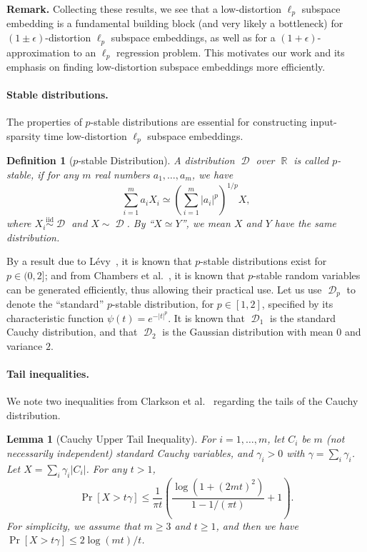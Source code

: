 \documentclass[11pt]{article}
\newtheorem{definition}{Definition}
\newtheorem{lemma}{Lemma}
\DeclareMathOperator{\R}{\mathbb{R}}
\DeclareMathOperator{\D}{\mathcal{D}}
\begin{document}
\noindent
\textbf{Remark.}
Collecting these results, we see that a low-distortion $\ell_p$ subspace
embedding is a fundamental building block (and very likely a bottleneck) for
$(1\pm\epsilon)$-distortion $\ell_p$ subspace embeddings, as well as for a
$(1+\epsilon)$-approximation to an $\ell_p$ regression problem. 
This motivates our work and its emphasis on finding low-distortion subspace 
embeddings more efficiently.

\paragraph{Stable distributions.}
\label{sec:stable-distributions}

The properties of $p$-stable distributions are essential for constructing
input-sparsity time low-distortion $\ell_p$ subspace embeddings.

\begin{definition}[$p$-stable Distribution]
  A distribution $\D$ over $\R$ is called $p$-stable, if for any $m$ real
  numbers $a_1,\ldots,a_m$, we have
  \begin{equation*}
    \sum_{i=1}^m a_i X_i \simeq \left( \sum_{i=1}^m |a_i|^p \right)^{1/p} X,
  \end{equation*}
  where $X_i \stackrel{\text{iid}}{\sim} \D$ and $X \sim \D$.
  By ``$X \simeq Y$'', we mean $X$ and $Y$ have the same distribution.
\end{definition}

\noindent
By a result due to L{\'e}vy~\cite{levy1925calcul}, it is known that $p$-stable
distributions exist for $p \in (0, 2]$; and from Chambers et
al.~\cite{chambers1976method}, it is known that $p$-stable random variables can
be generated efficiently, thus allowing their practical use.
Let us use $\D_p$ to denote the ``standard'' $p$-stable distribution, for
$p\in[1,2]$, specified by its characteristic function $\psi(t) = e^{-|t|^p}$.
It is known that $\D_1$ is the standard Cauchy distribution, and that $\D_2$ is
the Gaussian distribution with mean $0$ and variance $2$.

\paragraph{Tail inequalities.}
We note two inequalities from Clarkson et al.~\cite{CDMMMW13_SODA} regarding the
tails of the Cauchy distribution.

\begin{lemma}[Cauchy Upper Tail Inequality]
  \label{lemma:cauchy_upper}
  For $i=1,\ldots,m$, let $C_i$ be $m$ (not necessarily independent) standard
  Cauchy variables, and $\gamma_i > 0$ with $\gamma = \sum_i \gamma_i$.
  Let $X = \sum_i \gamma_i |C_i|$.
  For any $t > 1$,
  \begin{equation*}
    \Pr[X > t \gamma] \leq \frac{1}{\pi t} \left( \frac{\log(1+(2mt)^2)}{1 - 1/(\pi t)} + 1 \right).
  \end{equation*}
  For simplicity, we assume that $m \geq 3$ and $t \geq 1$, and then we have
  $\Pr[X > t \gamma] \leq 2 \log (m t)/ t$.
\end{lemma}
\end{document}
